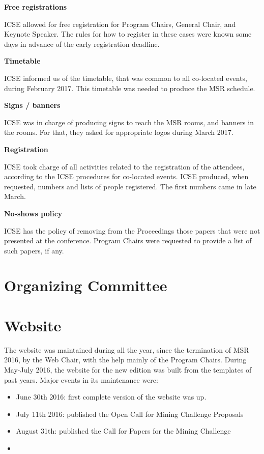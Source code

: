 \documentclass[a4paper]{report}
\begin{document}
\textbf{Free registrations}

ICSE allowed for free registration for Program Chairs, General Chair, and Keynote Speaker. The rules for how to register in these cases were known some days in advance of the early registration deadline.

\textbf{Timetable}

ICSE informed us of the timetable, that was common to all co-located events, during February 2017. This timetable was needed to produce the MSR schedule.

\textbf{Signs / banners}

ICSE was in charge of producing signs to reach the MSR rooms, and banners in the rooms. For that, they asked for appropriate logos during March 2017.

\textbf{Registration}

ICSE took charge of all activities related to the registration of the attendees, according to the ICSE procedures for co-located events. ICSE produced, when requested, numbers and lists of people registered. The first numbers came in late March.

\textbf{No-shows policy}

ICSE has the policy of removing from the Proceedings those papers that were not presented at the conference. Program Chairs were requested to provide a list of such papers, if any.

\section{Organizing Committee}

\section{Website}

The website was maintained during all the year, since the termination of MSR 2016, by the Web Chair, with the help mainly of the Program Chairs. During May-July 2016, the website for the new edition was built from the templates of past years. Major events in its maintenance were:

\begin{itemize}
\item June 30th 2016: first complete version of the website was up.
\item July 11th 2016: published the Open Call for Mining Challenge Proposals
\item August 31th: published the Call for Papers for the Mining Challenge
\item 
\end{itemize}
\end{document}
